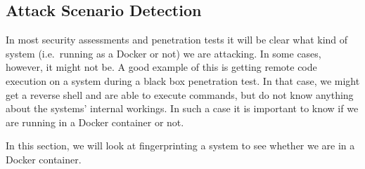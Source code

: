 \subsection{Attack Scenario Detection}\label{subsection:detection}
In most security assessments and penetration tests it will be clear what kind of system (i.e.\ running as a Docker or not) we are attacking. In some cases, however, it might not be. A good example of this is getting remote code execution on a system during a black box penetration test. In that case, we might get a reverse shell and are able to execute commands, but do not know anything about the systems' internal workings. In such a case it is important to know if we are running in a Docker container or not.

In this section, we will look at fingerprinting a system to see whether we are in a Docker container.





